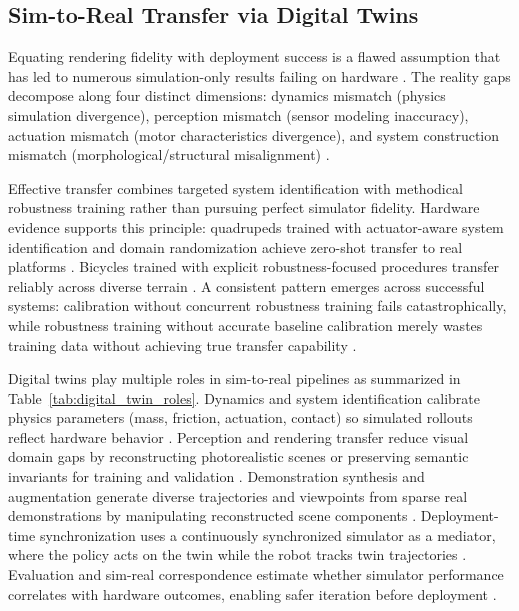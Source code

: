 \documentclass[12pt,a4paper,oneside]{report}
\begin{document}
\subsection{Sim-to-Real Transfer via Digital Twins}
\label{subsec:sim_to_real_transfer_via_digital_twins}

Equating rendering fidelity with deployment success is a flawed assumption that has led to numerous simulation-only results failing on hardware \cite{aljalbout2026realitygap}. The reality gaps decompose along four distinct dimensions: dynamics mismatch (physics simulation divergence), perception mismatch (sensor modeling inaccuracy), actuation mismatch (motor characteristics divergence), and system construction mismatch (morphological/structural misalignment) \cite{aljalbout2026realitygap, tan2018simtoreal}.

Effective transfer combines targeted system identification with methodical robustness training rather than pursuing perfect simulator fidelity. Hardware evidence supports this principle: quadrupeds trained with actuator-aware system identification and domain randomization achieve zero-shot transfer to real platforms \cite{tan2018simtoreal}. Bicycles trained with explicit robustness-focused procedures transfer reliably across diverse terrain \cite{liu2024cyclerl}. A consistent pattern emerges across successful systems: calibration without concurrent robustness training fails catastrophically, while robustness training without accurate baseline calibration merely wastes training data without achieving true transfer capability \cite{tan2018simtoreal, aljalbout2026realitygap}.

Digital twins play multiple roles in sim-to-real pipelines as summarized in Table~\ref{tab:digital_twin_roles}. Dynamics and system identification calibrate physics parameters (mass, friction, actuation, contact) so simulated rollouts reflect hardware behavior \cite{tan2018simtoreal, heiden2022inferring, lou2026drex}. Perception and rendering transfer reduce visual domain gaps by reconstructing photorealistic scenes or preserving semantic invariants for training and validation \cite{qureshi2025splatsim, tang2025semantic}. Demonstration synthesis and augmentation generate diverse trajectories and viewpoints from sparse real demonstrations by manipulating reconstructed scene components \cite{yang2025robosplat, yu2025real2render2real}. Deployment-time synchronization uses a continuously synchronized simulator as a mediator, where the policy acts on the twin while the robot tracks twin trajectories \cite{abou2024realissim}. Evaluation and sim-real correspondence estimate whether simulator performance correlates with hardware outcomes, enabling safer iteration before deployment \cite{jain2025polaris, li2024simpler}.
\end{document}
